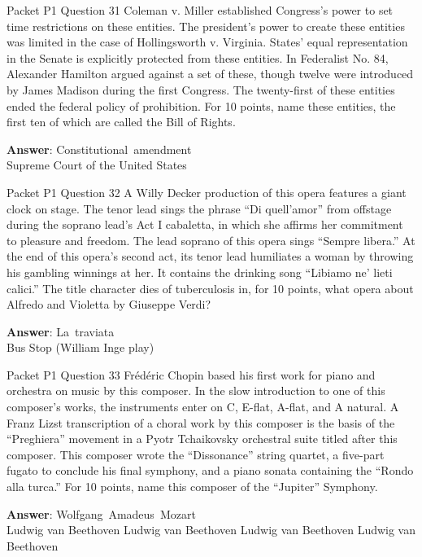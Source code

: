 \begin{frame}{Packet P1 Question 31}
Coleman v. Miller established       Congress's power to set time restrictions on these entities. The president's power to create these entities was limited in the case of Hollingsworth v. Virginia. States' equal representation in the Senate is explicitly protected from these entities. In Federalist No. 84, Alexander Hamilton argued against a set of these, though twelve were introduced by James Madison during the first Congress. The twenty-first of these entities ended the federal policy of prohibition. For 10 points, name these entities, the first ten of which are called the Bill of Rights.  

\textbf{Answer}: Constitutional\ amendment\\
 Supreme Court of the United States
\end{frame}

\begin{frame}{Packet P1 Question 32}
A Willy Decker production   of this opera features a giant clock on stage. The tenor lead sings the phrase ``Di quell'amor'' from offstage during the soprano lead's Act I cabaletta, in which     she affirms her commitment to pleasure and freedom. The lead soprano of this opera sings ``Sempre libera.'' At the end of this opera's second act, its tenor lead humiliates a woman by throwing his gambling winnings at her. It contains the drinking song ``Libiamo   ne' lieti calici.''   The title character dies of tuberculosis in, for 10 points, what opera about Alfredo and Violetta by Giuseppe Verdi?

\textbf{Answer}: La\ traviata\\
 Bus Stop (William Inge play)
\end{frame}

\begin{frame}{Packet P1 Question 33}
Frédéric Chopin based his first work for piano and orchestra on music by this composer. In the slow introduction to one of this composer's works, the instruments enter on C, E-flat, A-flat, and A natural. A Franz Lizst transcription of a choral work by this composer   is the basis of the ``Preghiera'' movement in a Pyotr Tchaikovsky orchestral suite titled after this composer. This composer wrote the ``Dissonance'' string quartet, a five-part fugato to conclude his final symphony, and   a piano sonata containing   the ``Rondo alla   turca.'' For 10 points,   name this composer of the ``Jupiter'' Symphony.    

\textbf{Answer}: Wolfgang\ Amadeus\ Mozart\\
 Ludwig van Beethoven
 Ludwig van Beethoven
 Ludwig van Beethoven
 Ludwig van Beethoven
\end{frame}

